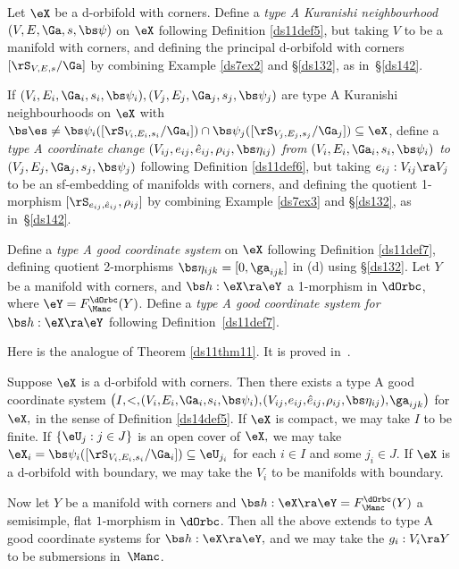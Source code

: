 \documentclass{article}
\begin{document}
\begin{dfn} Let $\eX$ be a d-orbifold with corners. Define a {\it
type A Kuranishi neighbourhood\/} $(V,E,\Ga,s,\bs\psi)$ on $\eX$
following Definition \ref{ds11def5}, but taking $V$ to be a manifold
with corners, and defining the principal d-orbifold with corners
$[\rS_{V,E,s}/\Ga]$ by combining Example \ref{ds7ex2} and
\S\ref{ds132}, as in~\S\ref{ds142}.

If $(V_i,E_i,\Ga_i,s_i,\bs\psi_i),(V_j,E_j,\Ga_j, s_j,\bs\psi_j)$
are type A Kuranishi neighbourhoods on $\eX$ with
$\bs\es\ne\bs\psi_i([\rS_{V_i,E_i,s_i}/\Ga_i])\cap
\bs\psi_j([\rS_{V_j,E_j,s_j}/\Ga_j])\subseteq\eX$, define a {\it
type A coordinate change $(V_{ij},e_{ij},\hat
e_{ij},\rho_{ij}, \bs\eta_{ij})$ from\/
$(V_i,E_i,\Ga_i,s_i,\bs\psi_i)$ to\/}
$(V_j,E_j,\Ga_j,s_j,\bs\psi_j)$ following Definition \ref{ds11def6},
but taking $e_{ij}:V_{ij}\ra V_j$ to be an sf-embedding of manifolds
with corners, and defining the
quotient 1-morphism $[\rS_{\smash{e_{ij},\hat e_{ij}}},\rho_{ij}]$
by combining Example \ref{ds7ex3} and \S\ref{ds132}, as
in~\S\ref{ds142}.

Define a {\it type A good coordinate system\/} on $\eX$ following
Definition \ref{ds11def7}, defining quotient 2-morphisms
$\bs\eta_{ijk}=[0,\ga_{ijk}]$ in (d) using \S\ref{ds132}. Let $Y$ be
a manifold with corners, and $\bs h:\eX\ra\eY$ a 1-morphism in
$\dOrbc$, where $\eY=F_\Manc^\dOrbc(Y)$. Define a {\it type A good
coordinate system for\/} $\bs h:\eX\ra\eY$ following
Definition~\ref{ds11def7}.
\label{ds14def5}
\end{dfn}

Here is the analogue of Theorem \ref{ds11thm11}. It is proved
in~\cite[App.~D]{Joyc6}.

\begin{thm} Suppose $\eX$ is a d-orbifold with corners. Then there
exists a type A good coordinate system $\bigl(I,\kern -.1em <,\kern
-.1em (V_i,\kern -.1em E_i,\kern -.1em \Ga_i,\kern -.1em s_i,\kern
-.1em \bs\psi_i),\kern -.1em (V_{ij},\kern -.1em e_{ij},\kern -.1em
\hat e_{ij},\kern -.1em\rho_{ij},\kern -.1em \bs\eta_{ij}),\kern
-.1em \ga_{ijk}\bigr)$ for $\eX,$ in the sense of Definition\/
{\rm\ref{ds14def5}}. If\/ $\eX$ is compact, we may take $I$ to be
finite. If\/ $\{\eU_j:j\in J\}$ is an open cover of\/ $\eX,$ we may
take $\eX_i=\bs\psi_i([\rS_{V_i,E_i,s_i}/\Ga_i]) \subseteq
\eU_{\smash{j_i}}$ for each\/ $i\in I$ and some\/ $j_i\in J$.
If\/ $\eX$ is a d-orbifold with boundary, we may take the $V_i$ to be manifolds with boundary.

Now let\/ $Y$ be a manifold with corners and\/ $\bs h:\eX\ra\eY=
F_\Manc^\dOrbc(Y)$ a semisimple, flat\/ $1$-morphism in $\dOrbc$. Then all the above extends to
type A good coordinate systems for $\bs h:\eX\ra\eY,$ and we may
take the $g_i:V_i\ra Y$ to be submersions in\/~$\Manc$.
\label{ds14thm11}
\end{thm}
\end{document}

